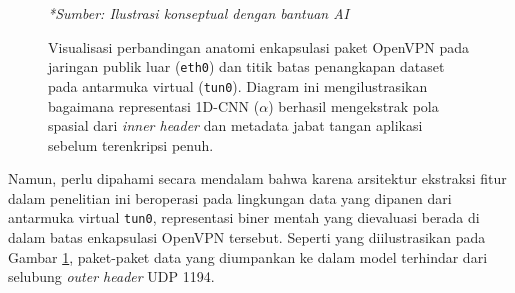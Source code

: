 \begin{figure}[h!]
{
    }
    \caption{Visualisasi perbandingan anatomi enkapsulasi paket OpenVPN pada jaringan publik luar (\texttt{eth0}) dan titik batas penangkapan dataset pada antarmuka virtual (\texttt{tun0}). Diagram ini mengilustrasikan bagaimana representasi 1D-CNN ($\alpha$) berhasil mengekstrak pola spasial dari \textit{inner header} dan metadata jabat tangan aplikasi sebelum terenkripsi penuh.}
    \label{fig:openvpn_encapsulation_structure}
    \vspace{0.2cm}
    {\scriptsize\textit{*Sumber: Ilustrasi konseptual dengan bantuan AI}}
\end{figure}

Namun, perlu dipahami secara mendalam bahwa karena arsitektur ekstraksi fitur dalam penelitian ini beroperasi pada lingkungan data yang dipanen dari antarmuka virtual \texttt{tun0}, representasi biner mentah yang dievaluasi berada di dalam batas enkapsulasi OpenVPN tersebut. Seperti yang diilustrasikan pada Gambar \ref{fig:openvpn_encapsulation_structure}, paket-paket data yang diumpankan ke dalam model terhindar dari selubung \textit{outer header} UDP 1194. 

